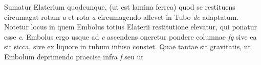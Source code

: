 \pstart
     Sumatur Elaterium\protect{} quodcunque, (ut est lamina ferrea) quod se restituens circumagat rotam \textit{a} et rota \textit{a} circumagendo allevet  in Tubo \textit{de} adaptatum.
                     Notetur locus in quem Embolus\protect{} totius Elaterii\protect{} restitutione elevatur, qui ponatur esse \textit{c}. Embolus\protect{} ergo usque ad \textit{c} ascendens oneretur pondere columnae \textit{fg} sive ea sit sicca, sive ex liquore\protect{} in tubum infuso constet. Quae tantae sit gravitatis\protect{}, ut Embolum\protect{} deprimendo praecise  infra \textit{f} seu ut 
